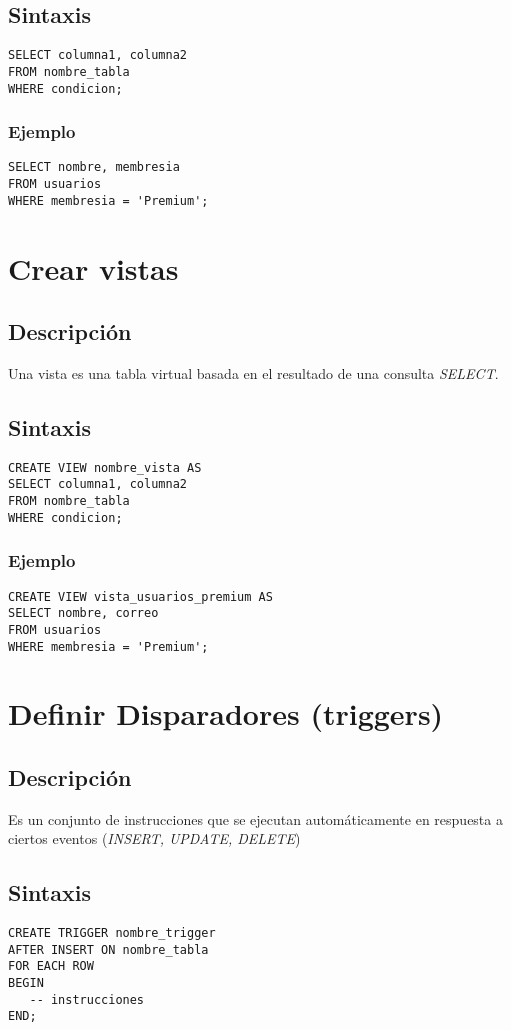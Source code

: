 \documentclass[12pt, a4paper]{article}
\begin{document}
\subsection{Sintaxis}
\begin{lstlisting}
SELECT columna1, columna2
FROM nombre_tabla
WHERE condicion;
\end{lstlisting}
\subsubsection{Ejemplo}
\begin{lstlisting}
SELECT nombre, membresia
FROM usuarios
WHERE membresia = 'Premium';
\end{lstlisting}

\section{Crear vistas}
\subsection{Descripción}
Una vista es una tabla virtual basada en el resultado de una consulta \textit{SELECT}.
\subsection{Sintaxis}
\begin{lstlisting}
CREATE VIEW nombre_vista AS
SELECT columna1, columna2
FROM nombre_tabla
WHERE condicion;
\end{lstlisting}
\subsubsection{Ejemplo}
\begin{lstlisting}
CREATE VIEW vista_usuarios_premium AS
SELECT nombre, correo
FROM usuarios
WHERE membresia = 'Premium';
\end{lstlisting}

\section{Definir Disparadores (triggers)}
\subsection{Descripción}
Es un conjunto de instrucciones que se ejecutan automáticamente en respuesta a ciertos eventos (\textit{INSERT, UPDATE, DELETE})
\subsection{Sintaxis}
\begin{lstlisting}
CREATE TRIGGER nombre_trigger
AFTER INSERT ON nombre_tabla
FOR EACH ROW
BEGIN
   -- instrucciones
END;
\end{lstlisting}
\end{document}
